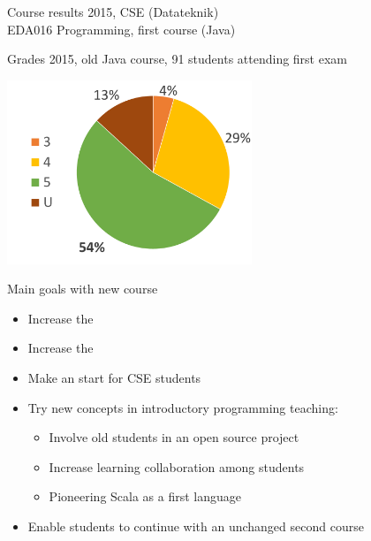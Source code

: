 \documentclass{lecturenotes}
\begin{document}
\begin{Slide}{Course results 2015, CSE (Datateknik)\\EDA016 Programming, first course (Java)}

Grades 2015, old Java course,  91 students attending first exam
\vspace{2em}

\includegraphics[width=0.55\textwidth]{img/grades-2015}


\end{Slide}

\begin{Slide}{Main goals with new course}\small
\begin{itemize}
\item Increase the 
\item Increase the 
\item Make an  start for CSE students
\item Try new concepts in introductory programming teaching:
\begin{itemize}
\item Involve old students in an open source project
\item Increase learning collaboration among students
\item Pioneering Scala as a first language
\end{itemize}
\item Enable students to continue with an unchanged second course
\end{itemize}
\end{Slide}
\end{document}
